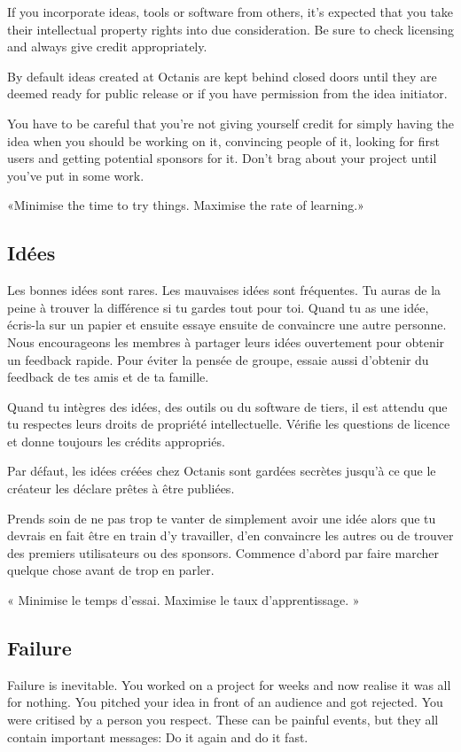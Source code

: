 	If you incorporate ideas, tools or software from others, it's expected that you take their intellectual property rights into due consideration. Be sure to check licensing and always give credit appropriately.

	By default ideas created at Octanis are kept behind closed doors until they are deemed ready for public release or if you have permission from the idea initiator.

	You have to be careful that you're not giving yourself credit for simply having the idea when you should be working on it, convincing people of it, looking for first users and getting potential sponsors for it. Don't brag about your project until you've put in some work.

	«Minimise the time to try things. Maximise the rate of learning.»





\french
	\subsection{Idées}
	Les bonnes idées sont rares. Les mauvaises idées sont fréquentes. Tu auras de la peine à trouver la différence si tu gardes tout pour toi. 
	Quand tu as une idée, écris-la sur un papier et ensuite essaye ensuite de convaincre une autre personne. Nous encourageons les membres à partager leurs idées ouvertement pour obtenir un feedback rapide. Pour éviter la pensée de groupe, essaie aussi d'obtenir du feedback de tes amis et de ta famille. 

	Quand tu intègres des idées, des outils ou du software de tiers, il est attendu que tu respectes leurs droits de propriété intellectuelle. Vérifie les questions de licence et donne toujours les crédits appropriés.

	Par défaut, les idées créées chez Octanis sont gardées secrètes jusqu'à ce que le créateur les déclare prêtes à être publiées.

	Prends soin de ne pas trop te vanter de simplement avoir une idée alors que tu devrais en fait être en train d'y travailler, d'en convaincre les autres ou de trouver des premiers utilisateurs ou des sponsors. Commence d'abord par faire marcher quelque chose avant de trop en parler. 

	« Minimise le temps d'essai. Maximise le taux d'apprentissage. »




\english
	\subsection{Failure}
	Failure is inevitable. You worked on a project for weeks and now realise it was all for nothing. You pitched your idea in front of an audience and got rejected. You were critised by a person you respect. 
	These can be painful events, but they all contain important messages: Do it again and do it fast.


